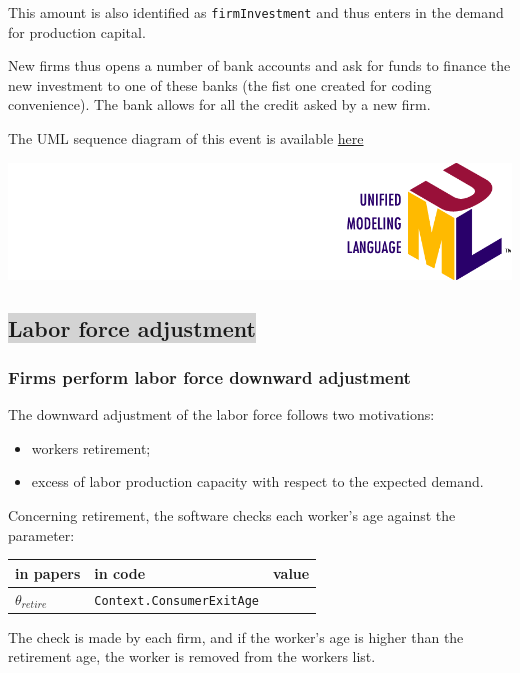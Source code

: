 \documentclass{book}
\newcommand{\umllocation}{file:///Users/giulioni/Dropbox/svn/sfcabm_my/documentation}
\begin{document}
\vskip3mm
This amount is also identified as \verb+firmInvestment+ and thus enters in the demand for production capital.

New firms thus opens a number of bank accounts and ask for funds to finance the new investment to one of these banks (the fist one created for coding convenience).
The bank allows for all the credit asked by a new firm.

\vskip3mm
The UML sequence diagram of this event is available \href{\umllocation/performFirmsEntry.html}{here}
\begin{marginfigure}
	\includegraphics[scale=0.1]{uml.png}
\end{marginfigure}



\subsection*{\colorbox{lightgray}{Labor force adjustment}}

\subsubsection{Firms perform labor force downward adjustment}

The downward adjustment of the labor force follows two motivations:
\begin{itemize}
	\item workers retirement;
	\item excess of labor production capacity with respect to the expected demand.
\end{itemize}

Concerning retirement, the software checks each worker's age against the parameter:\\

\vskip3mm
\noindent
\begin{tabular}{l l l}
	\hline
	in papers& in code&value\\
	\hline
	\hline
	$\theta_{retire}$&\verb+Context.ConsumerExitAge+&\\
	\hline
\end{tabular}

\vskip3mm
The check is made by each firm, and if the worker's age is higher than the retirement age, the worker is removed from the workers list.
\end{document}
